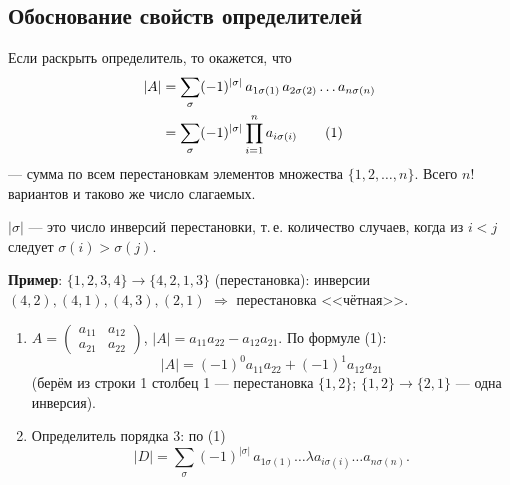 \documentclass[a4paper, 12pt]{article}
\begin{document}
\subsection{Обоснование свойств определителей}

Если раскрыть определитель, то окажется, что
\begin{align}
  |A| &= \sum_{\sigma} (-1)^{|\sigma|}\, a_{1\sigma(1)}\, a_{2\sigma(2)} \dots a_{n\sigma(n)} \notag\\
      &= \sum_{\sigma} (-1)^{|\sigma|} \prod_{i=1}^{n} a_{i\sigma(i)} \tag{1}
\end{align}
--- сумма по всем перестановкам элементов множества
$\{1, 2, \dots, n\}$. Всего $n!$ вариантов и таково же число слагаемых.

$|\sigma|$ --- это число инверсий перестановки, т.\,е. количество случаев,
когда из $i < j$ следует $\sigma(i) > \sigma(j)$.

\textbf{Пример}: $\{1, 2, 3, 4\} \to \{4, 2, 1, 3\}$ (перестановка): инверсии
$(4,2), (4,1), (4,3), (2,1)$ $\Rightarrow$ перестановка <<чётная>>.

\begin{enumerate}[label=\arabic*.]
  \item $A = \begin{pmatrix} a_{11} & a_{12} \\ a_{21} & a_{22} \end{pmatrix}$,
    $|A| = a_{11} a_{22} - a_{12} a_{21}$. По формуле (1):
    \[
      |A| = (-1)^0 a_{11} a_{22} + (-1)^1 a_{12} a_{21}
    \]
    (берём из строки 1 столбец 1 --- перестановка $\{1, 2\}$;
    $\{1, 2\} \to \{2, 1\}$ --- одна инверсия).
  \item Определитель порядка 3: по (1)
    \[
      |D| = \sum_{\sigma} (-1)^{|\sigma|}\, a_{1\sigma(1)} \dots \lambda a_{i\sigma(i)} \dots a_{n\sigma(n)}.
    \]
\end{enumerate}
\end{document}
